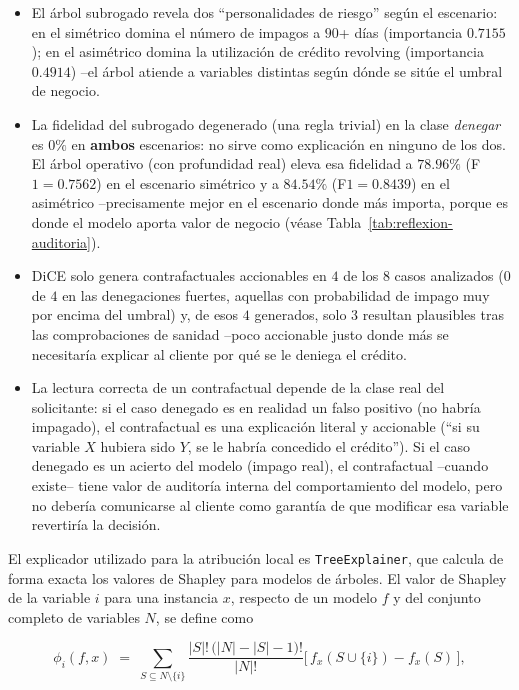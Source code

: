 \documentclass[11pt,a4paper]{article}
\begin{document}
\begin{itemize}
\item El \'arbol subrogado revela dos ``personalidades de riesgo'' seg\'un el escenario: en el sim\'etrico
domina el n\'umero de impagos a $90$+ d\'ias (importancia $0.7155$); en el asim\'etrico domina la
utilizaci\'on de cr\'edito revolving (importancia $0.4914$) --el \'arbol atiende a variables distintas
seg\'un d\'onde se sit\'ue el umbral de negocio.
\item La fidelidad del subrogado degenerado (una regla trivial) en la clase \emph{denegar} es $0\%$ en
\textbf{ambos} escenarios: no sirve como explicaci\'on en ninguno de los dos. El \'arbol operativo (con
profundidad real) eleva esa fidelidad a $78.96\%$ (F$1=0.7562$) en el escenario sim\'etrico y a $84.54\%$
(F$1=0.8439$) en el asim\'etrico --precisamente mejor en el escenario donde m\'as importa, porque es donde
el modelo aporta valor de negocio (v\'ease Tabla~\ref{tab:reflexion-auditoria}).
\item DiCE solo genera contrafactuales accionables en $4$ de los $8$ casos analizados ($0$ de $4$ en las
denegaciones fuertes, aquellas con probabilidad de impago muy por encima del umbral) y, de esos $4$
generados, solo $3$ resultan plausibles tras las comprobaciones de sanidad --poco accionable justo donde
m\'as se necesitar\'ia explicar al cliente por qu\'e se le deniega el cr\'edito.
\item La lectura correcta de un contrafactual depende de la clase real del solicitante: si el caso
denegado es en realidad un falso positivo (no habr\'ia impagado), el contrafactual es una explicaci\'on
literal y accionable (``si su variable $X$ hubiera sido $Y$, se le habr\'ia concedido el cr\'edito''). Si el
caso denegado es un acierto del modelo (impago real), el contrafactual --cuando existe-- tiene valor de
auditor\'ia interna del comportamiento del modelo, pero no deber\'ia comunicarse al cliente como garant\'ia
de que modificar esa variable revertir\'ia la decisi\'on.
\end{itemize}

El explicador utilizado para la atribuci\'on local es \texttt{TreeExplainer}, que calcula de forma exacta
los valores de Shapley para modelos de \'arboles. El valor de Shapley de la variable $i$ para una
instancia $x$, respecto de un modelo $f$ y del conjunto completo de variables $N$, se define como

\[
\phi_i(f,x) \;=\; \sum_{S \subseteq N\setminus\{i\}}
\frac{|S|!\,\big(|N|-|S|-1\big)!}{|N|!}\Big[\, f_x(S\cup\{i\}) - f_x(S) \,\Big],
\]
\end{document}
